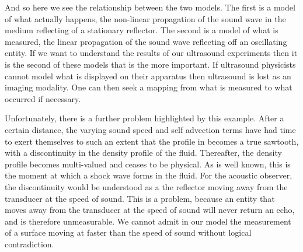 And so here we see the relationship between the two models.
The first is a model of what actually happens,
the non-linear propagation of the sound wave in the medium reflecting of a stationary reflector.
The second is a model of what is measured,
the linear propagation of the sound wave reflecting off an oscillating entity.
If we want to understand the results of our ultrasound experiments then it is the second of these models that is the more important.
%
If ultrasound physicists cannot model what is displayed on their apparatus then ultrasound is lost as an imaging modality.
One can then seek a mapping from what is measured to what occurred if necessary.
%

Unfortunately, there is a further problem highlighted by this example.
After a certain distance,
the varying sound speed and self advection terms have had time to exert themselves to such an extent that the profile in
 becomes a true sawtooth, with a discontinuity in the density profile of the fluid.
Thereafter, the density profile becomes multi-valued and ceases to be physical.
As is well known,
this is the moment at which a shock wave forms in the fluid.
For the acoustic observer, the discontinuity would be understood as a the reflector moving away from the transducer at the speed of sound.
%
This is a problem, because an entity that moves away from the transducer at the speed of sound will never return an echo,
and is therefore unmeasurable.
We cannot admit in our model the measurement of a surface moving at faster than the speed of sound
without logical contradiction.

